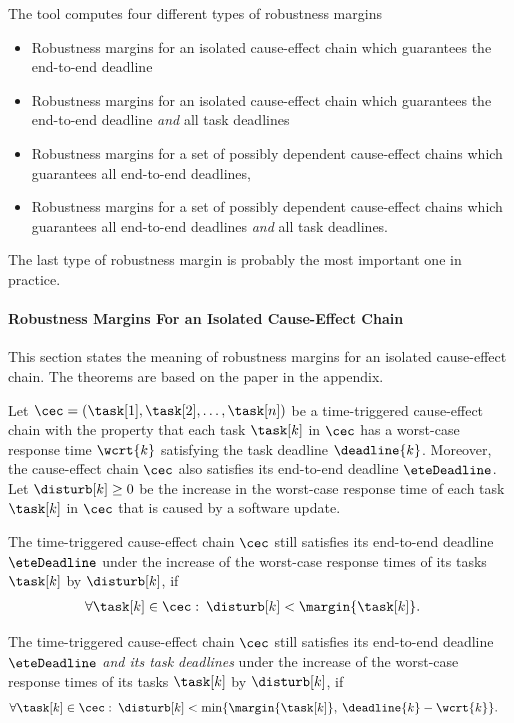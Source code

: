 The tool \Tool computes four different types of robustness margins
\begin{itemize}
	\item Robustness margins for an isolated cause-effect chain  which guarantees the end-to-end deadline
	\item Robustness margins for an isolated cause-effect chain  which guarantees the end-to-end deadline \emph{and} all task deadlines
	\item Robustness margins for a set of possibly dependent cause-effect chains which guarantees all end-to-end deadlines,
	\item Robustness margins for a set of possibly dependent cause-effect chains which guarantees all end-to-end deadlines \emph{and} all task deadlines.			
\end{itemize}
The last type of robustness margin is probably the most important one in practice.


\paragraph{Robustness Margins For an Isolated Cause-Effect Chain} 
This section states the meaning of robustness margins for an isolated cause-effect chain. 
The theorems are based on the paper in the appendix.

\begin{tcolorbox}[colback=black!5!white,colframe=black!75!black, breakable, 
title= \textbf{Theorem}: Robustness test for a single time-triggered cause-effect chain]
Let $\cec = (\task[1], \task[2], \ldots, \task[n])$ be a time-triggered cause-effect chain with the property that each task $\task[k]$ in $\cec$ has a worst-case response time $\wcrt{k}$ satisfying the task deadline $\deadline{k}$. 
Moreover, the cause-effect chain $\cec$ also satisfies its end-to-end deadline $\eteDeadline$.
Let $\disturb[k] \geq 0$ be the increase in the worst-case response time of each task $\task[k]$ in $\cec$ that is caused by a software update.
\smallskip

The time-triggered cause-effect chain $\cec$ still satisfies its end-to-end deadline $\eteDeadline$ under the increase of the worst-case response times of its tasks $\task[k]$ by $\disturb[k]$, if  
\begin{align*}
	& \forall \task[k] \in \cec: \:
	\disturb[k] < \margin{\task[k]} .
\end{align*}	

The time-triggered cause-effect chain $\cec$ still satisfies its end-to-end deadline $\eteDeadline$ \emph{and its task deadlines} under the increase of the worst-case response times of its tasks $\task[k]$ by $\disturb[k]$, if  
\begin{align*}
	& \forall \task[k] \in \cec: \:
	\disturb[k] < 
	\min \{\margin{\task[k]}, \: \deadline{k} - \wcrt{k}\}.
\end{align*}	

\end{tcolorbox}
\smallskip

